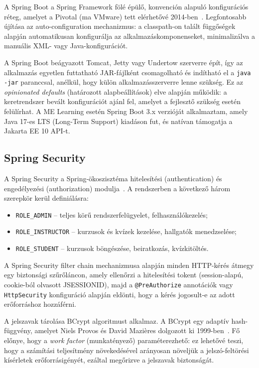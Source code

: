 A Spring Boot a Spring Framework fölé épülő, konvención alapuló konfigurációs réteg, amelyet a Pivotal (ma VMware) tett elérhetővé 2014-ben~\cite{walls2019spring}. Legfontosabb újítása az auto-configuration mechanizmus: a classpath-on talált függőségek alapján automatikusan konfigurálja az alkalmazáskomponenseket, minimalizálva a manuális XML- vagy Java-konfigurációt.

A Spring Boot beágyazott Tomcat, Jetty vagy Undertow szerverre épít, így az alkalmazás egyetlen futtatható JAR-fájlként csomagolható és indítható el a \texttt{java -jar} paranccsal, anélkül, hogy külön alkalmazásszerverre lenne szükség. Ez az \textit{opinionated defaults} (határozott alapbeállítások) elve alapján működik: a keretrendszer bevált konfigurációt ajánl fel, amelyet a fejlesztő szükség esetén felülírhat. A ME Learning esetén Spring Boot 3.x verzióját alkalmaztam, amely Java 17-es LTS (Long-Term Support) kiadáson fut, és natívan támogatja a Jakarta EE 10 API-t.

\subsection{Spring Security}

A Spring Security a Spring-ökoszisztéma hitelesítési (authentication) és engedélyezési (authorization) modulja~\cite{winch2023springsecurity}. A rendszerben a következő három szerepkör kerül definiálásra:

\begin{itemize}
    \item \texttt{ROLE\_ADMIN} – teljes körű rendszerfelügyelet, felhasználókezelés;
    \item \texttt{ROLE\_INSTRUCTOR} – kurzusok és kvízek kezelése, hallgatók menedzselése;
    \item \texttt{ROLE\_STUDENT} – kurzusok böngészése, beiratkozás, kvízkitöltés.
\end{itemize}

A Spring Security filter chain mechanizmusa alapján minden HTTP-kérés átmegy egy biztonsági szűrőláncon, amely ellenőrzi a hitelesítési tokent (session-alapú, cookie-ból olvasott JSESSIONID), majd a \texttt{@PreAuthorize} annotációk vagy \texttt{HttpSecurity} konfiguráció alapján eldönti, hogy a kérés jogosult-e az adott erőforráshoz hozzáférni.

A jelszavak tárolása BCrypt algoritmust alkalmaz. A BCrypt egy adaptív hash-függvény, amelyet Niels Provos és David Mazières dolgozott ki 1999-ben~\cite{provos1999bcrypt}. Fő előnye, hogy a \textit{work factor} (munkatényező) paraméterezhető: ez lehetővé teszi, hogy a számítási teljesítmény növekedésével arányosan növeljük a jelszó-feltörési kísérletek erőforrásigényét, ezáltal megőrizve a jelszavak biztonságát.


